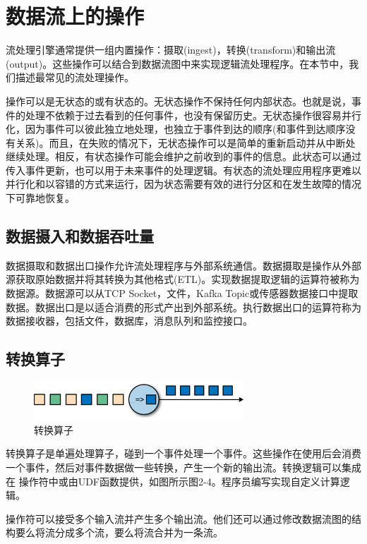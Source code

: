 \documentclass[cn,11pt,chinese]{elegantbook}
\begin{document}
\section{数据流上的操作}

流处理引擎通常提供一组内置操作：摄取(ingest)，转换(transform)和输出流(output)。这些操作可以结合到数据流图中来实现逻辑流处理程序。在本节中，我们描述最常见的流处理操作。

操作可以是无状态的或有状态的。无状态操作不保持任何内部状态。也就是说，事件的处理不依赖于过去看到的任何事件，也没有保留历史。无状态操作很容易并行化，因为事件可以彼此独立地处理，也独立于事件到达的顺序(和事件到达顺序没有关系)。而且，在失败的情况下，无状态操作可以是简单的重新启动并从中断处继续处理。相反，有状态操作可能会维护之前收到的事件的信息。此状态可以通过传入事件更新，也可以用于未来事件的处理逻辑。有状态的流处理应用程序更难以并行化和以容错的方式来运行，因为状态需要有效的进行分区和在发生故障的情况下可靠地恢复。

\subsection{数据摄入和数据吞吐量}

数据摄取和数据出口操作允许流处理程序与外部系统通信。数据摄取是操作从外部源获取原始数据并将其转换为其他格式(ETL)。实现数据提取逻辑的运算符被称为数据源。数据源可以从TCP Socket，文件，Kafka Topic或传感器数据接口中提取数据。数据出口是以适合消费的形式产出到外部系统。执行数据出口的运算符称为数据接收器，包括文件，数据库，消息队列和监控接口。

\subsection{转换算子}

\begin{figure}[htbp]
  \centering
  \includegraphics[width=0.7\textwidth]{images/spaf_0204.png}
  \caption{转换算子}
\end{figure}

转换算子是单遍处理算子，碰到一个事件处理一个事件。这些操作在使用后会消费一个事件，然后对事件数据做一些转换，产生一个新的输出流。转换逻辑可以集成在 操作符中或由UDF函数提供，如图所示图2-4。程序员编写实现自定义计算逻辑。

操作符可以接受多个输入流并产生多个输出流。他们还可以通过修改数据流图的结构要么将流分成多个流，要么将流合并为一条流。
\end{document}
